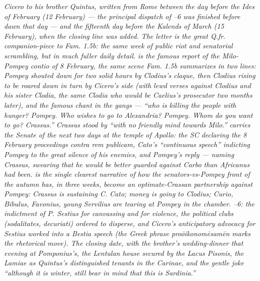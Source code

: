 
\textit{Cicero to his brother Quintus, written from Rome
between the day before the Ides of February (12 February) ---
the principal dispatch of --6 was finished
before dawn that day --- and the fifteenth day before the
Kalends of March (15 February), when the closing line was
added. The letter is the great Q.fr. companion-piece to
Fam. 1.5b: the same week of public riot and senatorial
scrambling, but in much fuller daily detail.  is
the famous report of the Milo-Pompey contio of 8 February,
the same scene Fam. 1.5b summarizes in two lines: Pompey
shouted down for two solid hours by Clodius's claque, then
Clodius rising to be roared down in turn by Cicero's side
(with lewd verses against Clodius and his sister Clodia, the
same Clodia who would be Caelius's prosecutor two months
later), and the famous chant in the gangs --- ``who is killing
the people with hunger? Pompey. Who wishes to go to Alexandria?
Pompey. Whom do you want to go? Crassus.'' Crassus stood by
``with no friendly mind towards Milo.''  carries
the Senate of the next two days at the temple of Apollo: the
SC declaring the 8 February proceedings \textit{contra rem
publicam}, Cato's ``continuous speech'' indicting Pompey to
the great silence of his enemies, and Pompey's reply ---
naming Crassus, swearing that he would be better guarded
against Carbo than Africanus had been.  is the
single clearest narrative of how the senators-vs-Pompey
front of the autumn has, in three weeks, become an
optimate-Crassan partnership against Pompey: Crassus is
sustaining C. Cato; money is going to Clodius; Curio,
Bibulus, Favonius, young Servilius are tearing at Pompey
in the chamber. --6: the indictment of P.
Sestius for canvassing and for violence, the political
clubs (\textit{sodalitates}, \textit{decuriati}) ordered to
disperse, and Cicero's anticipatory advocacy for Sestius
worked into a Bestia speech (the Greek phrase
\textit{pro\=oikonom\=esam\=en} marks the rhetorical move).
The closing date, with the brother's wedding-dinner that
evening at Pomponius's, the Lentulan house secured by the
Lacus Pisonis, the Lamiae as Quintus's distinguished
tenants in the Carinae, and the gentle joke ``although it
is winter, still bear in mind that this is Sardinia.''}
